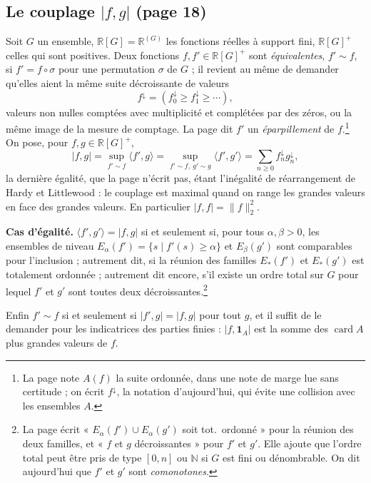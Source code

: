 \documentclass[11pt,a4paper]{article}
\begin{document}
\subsection*{Le couplage $|f, g|$ (page 18)}

Soit $G$ un ensemble, $\mathbb{R}[G] = \mathbb{R}^{(G)}$ les fonctions réelles
à support fini, $\mathbb{R}[G]^+$ celles qui sont positives. Deux fonctions
$f, f' \in \mathbb{R}[G]^+$ sont \emph{équivalentes}, $f' \sim f$, si
$f' = f \circ \sigma$ pour une permutation $\sigma$ de $G$ ; il revient au
même de demander qu'elles aient la même suite décroissante de valeurs
\[
f^{\downarrow} = (f^{\downarrow}_0 \geqslant f^{\downarrow}_1 \geqslant \cdots),
\]
valeurs non nulles comptées avec multiplicité et complétées par des zéros, ou
la même image de la mesure de comptage. La page dit $f'$ un
\emph{éparpillement} de $f$.\footnote{La page note $A(f)$ la suite ordonnée,
dans une note de marge lue sans certitude ; on écrit $f^{\downarrow}$, la
notation d'aujourd'hui, qui évite une collision avec les ensembles $A$.} On
pose, pour $f, g \in \mathbb{R}[G]^+$,
\[
|f, g| = \sup_{f' \sim f} \langle f', g \rangle
= \sup_{f' \sim f,\ g' \sim g} \langle f', g' \rangle
= \sum_{n \geqslant 0} f^{\downarrow}_n g^{\downarrow}_n ,
\]
la dernière égalité, que la page n'écrit pas, étant l'inégalité de
réarrangement de Hardy et Littlewood : le couplage est maximal quand on range
les grandes valeurs en face des grandes valeurs. En particulier
$|f, f| = \|f\|_2^2$.

\textbf{Cas d'égalité.} $\langle f', g' \rangle = |f, g|$ si et seulement si,
pour tous $\alpha, \beta > 0$, les ensembles de niveau
$E_\alpha(f') = \{s \mid f'(s) \geqslant \alpha\}$ et $E_\beta(g')$ sont
comparables pour l'inclusion ; autrement dit, si la réunion des familles
$E_*(f')$ et $E_*(g')$ est totalement ordonnée ; autrement dit encore, s'il
existe un ordre total sur $G$ pour lequel $f'$ et $g'$ sont toutes deux
décroissantes.\footnote{La page écrit « $E_\alpha(f') \cup E_\alpha(g')$ soit
tot.\ ordonné » pour la réunion des deux familles, et « $f$ et $g$
décroissantes » pour $f'$ et $g'$. Elle ajoute que l'ordre total peut être
pris de type $[0, n]$ ou $\mathbb{N}$ si $G$ est fini ou dénombrable. On
dit aujourd'hui que $f'$ et $g'$ sont \emph{comonotones}.}

Enfin $f' \sim f$ si et seulement si $|f', g| = |f, g|$ pour tout $g$, et il
suffit de le demander pour les indicatrices des parties finies :
$|f, \mathbf{1}_A|$ est la somme des $\operatorname{card} A$ plus grandes
valeurs de $f$.
\end{document}

